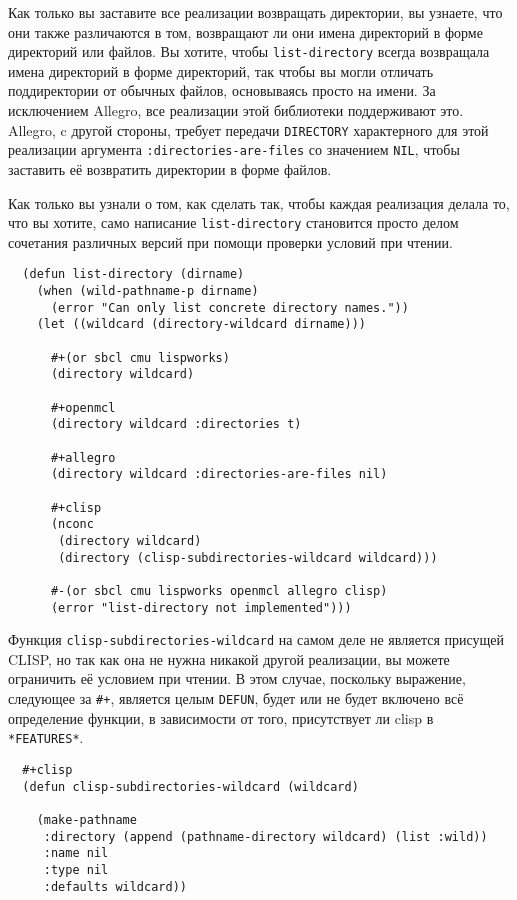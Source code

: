Как только вы заставите все реализации возвращать директории, вы узнаете, что они также
различаются в том, возвращают ли они имена директорий в форме директорий или файлов. Вы
хотите, чтобы \lstinline{list-directory} всегда возвращала имена директорий в форме директорий,
так чтобы вы могли отличать поддиректории от обычных файлов, основываясь просто на
имени. За исключением Allegro, все реализации этой библиотеки поддерживают это.  Allegro,
c другой стороны, требует передачи \lstinline{DIRECTORY} характерного для этой реализации
аргумента \lstinline{:directories-are-files} со значением \lstinline{NIL}, чтобы заставить её
возвратить директории в форме файлов.

Как только вы узнали о том, как сделать так, чтобы каждая реализация делала то, что вы
хотите, само написание \lstinline{list-directory} становится просто делом сочетания различных
версий при помощи проверки условий при чтении.

\begin{lstlisting}
  (defun list-directory (dirname)
    (when (wild-pathname-p dirname)
      (error "Can only list concrete directory names."))
    (let ((wildcard (directory-wildcard dirname)))

      #+(or sbcl cmu lispworks)
      (directory wildcard)

      #+openmcl
      (directory wildcard :directories t)

      #+allegro
      (directory wildcard :directories-are-files nil)

      #+clisp
      (nconc
       (directory wildcard)
       (directory (clisp-subdirectories-wildcard wildcard)))

      #-(or sbcl cmu lispworks openmcl allegro clisp)
      (error "list-directory not implemented")))
\end{lstlisting}

Функция \lstinline{clisp-subdirectories-wildcard} на самом деле не является присущей CLISP, но
так как она не нужна никакой другой реализации, вы можете ограничить её условием при
чтении. В этом случае, поскольку выражение, следующее за \lstinline!#+!, является целым
\lstinline{DEFUN}, будет или не будет включено всё определение функции, в зависимости от того,
присутствует ли clisp в \lstinline{*FEATURES*}.

\begin{lstlisting}
  #+clisp
  (defun clisp-subdirectories-wildcard (wildcard)

    (make-pathname
     :directory (append (pathname-directory wildcard) (list :wild))
     :name nil
     :type nil
     :defaults wildcard))
\end{lstlisting}

